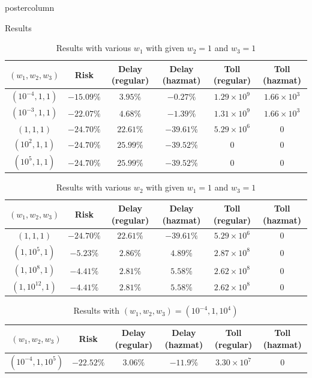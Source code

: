 \documentclass[final]{beamer}
\begin{document}
\begin{frame}
\begin{columns}
\begin{column}{0.32\textwidth}
\begin{beamercolorbox}[center,wd=\textwidth]{postercolumn}
\begin{minipage}[T]{.95\textwidth}
{\begin{block}{Results}
  \begin{table} \centering \footnotesize
  \begin{tabular}{|c|c|c|c|c|c|}
  \hline
  $(w_1,w_2,w_3)$ & Risk & Delay (regular) & Delay (hazmat) & Toll (regular) & Toll (hazmat)\\ \hline
  $(10^{-4},1,1)$ & $-15.09 \%$ & $3.95 \% $ & $-0.27\% $ & $1.29 \times 10^9 $ & $1.66 \times 10^3$\\
  \hline
  $(10^{-3},1,1)$ & $-22.07 \%$ & $4.68 \% $ & $-1.39\% $ & $1.31 \times 10^9$ & $1.66 \times 10^3$\\
  \hline
  $(1,1,1)$ & $-24.70\%$ & $22.61\% $ & $-39.61\% $ & $5.29 \times 10^6$ & $0$\\ \hline
  $(10^2,1,1)$ & $-24.70 \%$ & $25.99 \% $ & $-39.52\% $ &$0$  & $0$\\
  \hline $(10^5,1,1)$ & $-24.70 \%$ & $25.99 \% $ & $-39.52\% $ & $0$
  & $0$
  \\
  \hline
  \end{tabular}
  \caption{Results with various $w_1$ with given $w_2 = 1$ and $w_3 =1$}
  \label{tbl:result1} 
  \end{table}
  
  \begin{table} \centering
  \footnotesize
  \begin{tabular}{|c|c|c|c|c|c|}
  \hline
  $(w_1,w_2,w_3)$ & Risk & Delay (regular) & Delay (hazmat) & Toll (regular) & Toll (hazmat)\\ \hline
  $(1,1,1)$ & $-24.70\%$ & $22.61\% $ & $-39.61\% $ & $5.29 \times 10^6$ & $0$\\ \hline
  $(1,10^5,1)$ & $-5.23\%$ & $2.86 \% $ & $4.89\% $ & $2.87 \times 10^8$ & $0$\\
  \hline
  $(1,10^8,1)$ & $-4.41 \%$ & $2.81 \% $ & $5.58\% $ & $2.62 \times 10^8$ & $0$\\
  \hline
  $(1,10^{12},1)$ & $-4.41 \%$ & $2.81 \% $ & $5.58\% $ & $2.62 \times 10^8$ & $0$\\
  \hline
  \end{tabular}
  \caption{Results with various $w_2$ with given $w_1 = 1$ and $w_3 =1$} 
  \label{tbl:result2} 
  \end{table}
  
  \begin{table} \centering
  \footnotesize
  \begin{tabular}{|c|c|c|c|c|c|}
  \hline
  $(w_1,w_2,w_3)$ & Risk & Delay (regular) & Delay (hazmat) & Toll (regular) & Toll (hazmat)\\ \hline
  $(10^{-4},1,10^5)$ & $-22.52 \%$ & $3.06 \% $ & $-11.9\% $ & $3.30 \times 10^7$ & 0\\
  \hline
  \end{tabular}
  \caption{Results with $(w_1, w_2,w_3)=(10^{-4}, 1 , 10^4)$}
  \label{tbl:result3}
  \end{table}


\end{block}}
\end{minipage}
\end{beamercolorbox}
\end{column}
\end{columns}
\end{frame}
\end{document}
